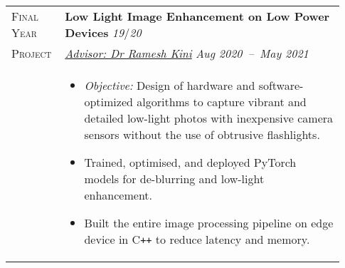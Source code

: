 \documentclass[letterpaper, 10pt, oneside]{article}
\newcommand{\stitle}[1]{\normalsize{\textsc{#1}}}
\newcommand{\bdit}[1]{{\textbf{#1}}}
\begin{document}
\begin{longtable}{@{} p{0.13\linewidth} p{0.8\linewidth}}
    \stitle{Final Year}  & \bdit{Low Light Image Enhancement on Low Power Devices} \hfill \textsl{19}/\textsl{20}                                                                                          \\
    \stitle{Project}     & \textsl{\href{https://ece.nitk.ac.in/faculty/ramesh-kini-m}{Advisor: Dr Ramesh Kini}} \hfill \textsl{Aug 2020\ --\ May 2021}                                                    \\
                         & \parbox{0.8\textwidth}{                                                                                                                                                         %
        \begin{itemize}[leftmargin=*, itemsep=-0.70ex, topsep=-0.88ex]
            \item \textsl{Objective:} Design of hardware and software-optimized algorithms to capture vibrant and detailed low-light photos with inexpensive camera sensors without the use of obtrusive flashlights.
            \item Trained, optimised, and deployed PyTorch models for de-blurring and low-light enhancement.
            \item Built the entire image processing pipeline on edge device in C\texttt{++} to reduce latency and memory.
        \end{itemize}
    }
    \\
    \\





\end{longtable}
\end{document}
